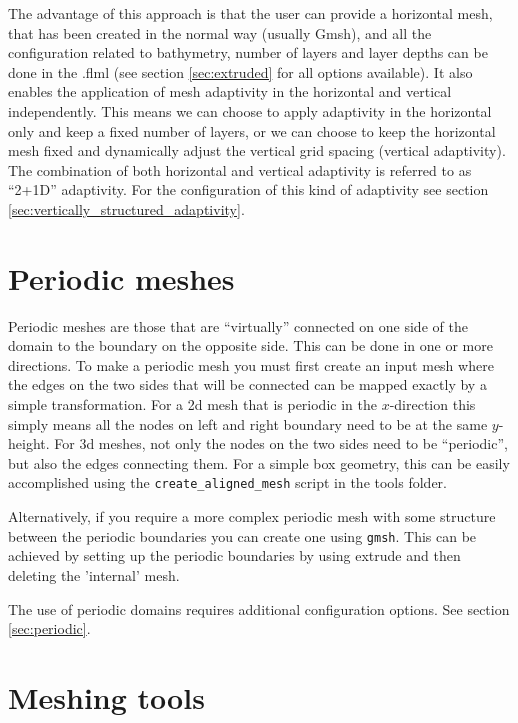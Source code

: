 The advantage of this approach is that the user can provide a horizontal mesh,
that has been created in the normal way (usually Gmsh), and all the
configuration related to bathymetry, number of layers and layer depths can be
done in the .flml (see section \ref{sec:extruded} for all options available). It also
enables the application of mesh adaptivity in the horizontal and vertical
independently. This means we can choose to apply adaptivity in the horizontal
only and keep a fixed number of layers, or we can choose to keep the horizontal
mesh fixed and dynamically adjust the vertical grid spacing (vertical
adaptivity). The combination of both horizontal and vertical adaptivity is
referred to as ``2+1D'' adaptivity. For the configuration of this kind of
adaptivity see section \ref{sec:vertically_structured_adaptivity}.

\section{Periodic meshes}
\label{sec:periodic_meshes}
Periodic meshes are those that are ``virtually'' connected on one side of the
domain to the boundary on the opposite side. This can be done in one or more
directions. To make a periodic
mesh you must first create an input mesh where the edges on the two sides
that will be connected
can be mapped exactly by a simple transformation. For a 2d mesh that is 
periodic in the $x$-direction this simply means all the nodes on left and right
boundary need to be at the same $y$-height. For 3d meshes, not only the nodes
on the two sides need to be ``periodic'', but also the edges connecting them.
For a simple box geometry, this can be easily accomplished using the
\lstinline[language=Bash]+create_aligned_mesh+ script in the tools folder.

Alternatively, if you require a more complex periodic mesh with some structure between the periodic 
boundaries you can create one using \lstinline[language=Bash]{gmsh}. This can be achieved by 
setting up the periodic boundaries by using extrude and then deleting the 'internal' mesh.

The use of periodic domains requires additional configuration options. See
section \ref{sec:periodic}.

\section{Meshing tools}
\label{sec:meshing_tools}

